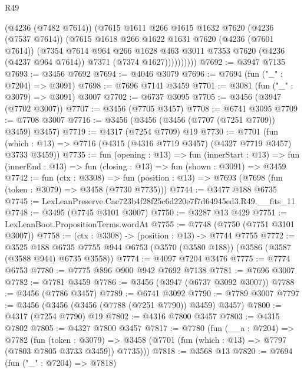 \begin{lexlean}{R49}
\begin{coremodule}
                (@4236 (@7482 @7614))
                (@7615
                  @1611
                  @266
                  @1615
                  @1632
                  @7620
                  (@4236 (@7537 @7614))
                  (@7615
                    @1618
                    @266
                    @1622
                    @1631
                    @7620
                    (@4236 (@7601 @7614))
                    (@7354
                      @7614
                      @964
                      @266
                      @1628
                      @463
                      @3011
                      @7353
                      @7620
                      (@4236 (@4237 @964 @7614))
                      @7371
                      (@7374 @1627))))))))))
@7692 := @3947 @7135
@7693 := @3456 @7692
@7694 := @4046 @3079
@7696 := @7694 (fun ("_" : @7204) => @3091)
@7698 := @7696 @7141 @3459
@7701 := @3081 (fun ("_" : @3079) => @3091) @3007
@7702 := @6737 @3095
@7705 := @3456 (@3947 (@7702 @3007))
@7707 := @3456 (@7705 @3457)
@7708 := @6741 @3095
@7709 := @7708 @3007
@7716 := @3456 (@3456 (@3456 (@7707 (@7251 @7709)) @3459) @3457)
@7719 := @4317 (@7254 @7709) @19
@7730 := @7701
    (fun (which : @13) => @7716 (@4315 (@4316 @7719 @3457) (@4327 @7719 @3457) @3733 @3459))
@7735 := fun (opening : @13) =>
  fun (innerStart : @13) =>
  fun (innerEnd : @13) => fun (closing : @13) => fun (shown : @3091) => @3459
@7742 := fun (ctx : @3308) =>
  fun (position : @13) => @7693 (@7698 (fun (token : @3079) => @3458 (@7730 @7735)))
@7744 := @3477 @188 @6735
@7745 := LexLeanPreserve.Cae723b4f28f25c6d220e7f7d64945ed3.R49.__fits_11
@7748 := @3495 (@7745 @3101 @3007)
@7750 := @3287 @13 @429
@7751 := LexLeanBoot.PropositionTerms.wordAt
@7755 := @7748 (@7750 (@7751 @3101 @3007))
@7758 := (ctx : @3308) -> (position : @13) -> @7744 @7755
@7772 := @3525
    @188
    @6735
    @7755
    @944
    @6753
    (@3570 (@3580 @188))
    (@3586 (@3587 (@3588 @944) @6735 @3558))
@7774 := @4097 @7204 @3476
@7775 := @7774 @6753
@7780 := @7775 @896 @900 @942 @7692 @7138
@7781 := @7696 @3007
@7782 := @7781 @3459
@7786 := @3456 (@3947 (@6737 @3092 @3007))
@7788 := @3456 (@7786 @3457)
@7789 := @6741 @3092
@7790 := @7789 @3007
@7797 := @3456 (@3456 (@3456 (@7788 (@7251 @7790)) @3459) @3457)
@7800 := @4317 (@7254 @7790) @19
@7802 := @4316 @7800 @3457
@7803 := @4315 @7802
@7805 := @4327 @7800 @3457
@7817 := @7780
    (fun (__a : @7204) =>
    @7782
      (fun (token : @3079) =>
      @3458 (@7701 (fun (which : @13) => @7797 (@7803 @7805 @3733 @3459)) @7735)))
@7818 := @3568 @13
@7820 := @7694 (fun ("_" : @7204) => @7818)

\end{coremodule}
\end{lexlean}
